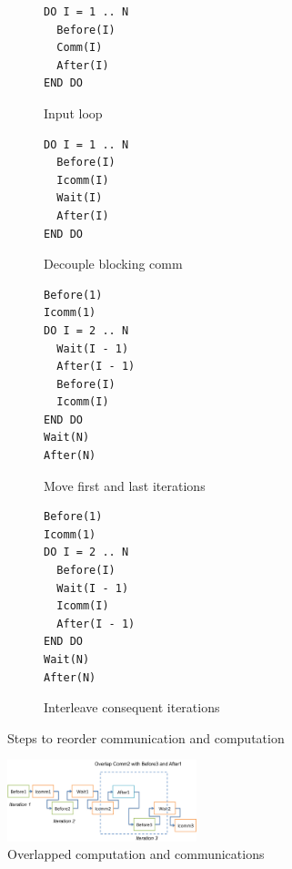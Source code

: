 \begin{figure}
{\scriptsize
  \centering
  \begin{subfigure}[b]{.25\textwidth}
\begin{verbatim}
DO I = 1 .. N
  Before(I)
  Comm(I)
  After(I)
END DO
\end{verbatim}
    \caption{Input loop}
    \label{fig:cco:reorder:a}
    \vspace{.1in}
  \end{subfigure}
  \begin{subfigure}[b]{.25\textwidth}
\begin{verbatim}
DO I = 1 .. N
  Before(I)
  Icomm(I)
  Wait(I)
  After(I)
END DO
\end{verbatim}
    \caption{Decouple blocking comm}
    \label{fig:cco:reorder:b}
    \vspace{.1in}
  \end{subfigure}
  \begin{subfigure}[b]{.25\textwidth}
\begin{verbatim}
Before(1)
Icomm(1)
DO I = 2 .. N
  Wait(I - 1)
  After(I - 1)
  Before(I)
  Icomm(I)
END DO
Wait(N)
After(N)
\end{verbatim}
    \caption{Move first and last iterations}
    \label{fig:cco:reorder:c}
    \vspace{.1in}
  \end{subfigure}
  \begin{subfigure}[b]{.25\textwidth}
\begin{verbatim}
Before(1)
Icomm(1)
DO I = 2 .. N
  Before(I)
  Wait(I - 1)
  Icomm(I)
  After(I - 1)
END DO
Wait(N)
After(N)
\end{verbatim}
    \caption{Interleave consequent iterations}
    \label{fig:cco:reorder:d}
  \end{subfigure}
\caption{Steps to reorder communication and computation}
\label{fig:cco:reorder}
}
\end{figure}

\begin{figure}[h]
\centering
\includegraphics[width=0.49\textwidth]{fig/ft_shift.png}
\caption{Overlapped computation and communications}
\label{fig:cco:shift}
\end{figure}

